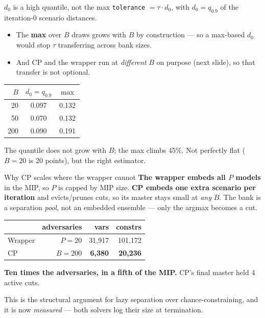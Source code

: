 \documentclass{beamer}
\begin{document}
\begin{frame}{$d_0$ is a high quantile, not the max}
  \small
  \texttt{tolerance} $=\tau\cdot d_0$, with $d_0 = q_{0.9}$ of the iteration-0
  scenario distances.
  \begin{itemize}
    \item The \textbf{max} over $B$ draws grows with $B$ by construction --- so a
      max-based $d_0$ would stop $\tau$ transferring across bank sizes.
    \item And CP and the wrapper run at \emph{different} $B$ on purpose (next
      slide), so that transfer is not optional.
  \end{itemize}
  \medskip
  \begin{center}\small
  \begin{tabular}{@{}rcc@{}}
    \toprule
    $B$ & $d_0 = q_{0.9}$ & $\max$ \\
    \midrule
     20 & 0.097 & 0.132 \\
     50 & 0.070 & 0.132 \\
    200 & 0.090 & 0.191 \\
    \bottomrule
  \end{tabular}
  \end{center}
  \medskip
  \footnotesize
  The quantile does not grow with $B$; the max climbs 45\%. Not perfectly flat
  ($B=20$ is 20 points), but the right estimator.
\end{frame}

\begin{frame}{Why CP scales where the wrapper cannot}
  \small
  \textbf{The wrapper embeds all $P$ models} in the MIP, so $P$ is capped by MIP
  size. \textbf{CP embeds one extra scenario per iteration} and evicts/prunes
  cuts, so its master stays small at \emph{any} $B$. The bank is a separation
  \emph{pool}, not an embedded ensemble --- only the argmax becomes a cut.
  \medskip
  \begin{center}\small
  \begin{tabular}{@{}lrrr@{}}
    \toprule
    & adversaries & vars & constrs \\
    \midrule
    Wrapper & $P=20$  & 31{,}917 & 101{,}172 \\
    CP      & $B=200$ & \textbf{6{,}380} & \textbf{20{,}236} \\
    \bottomrule
  \end{tabular}
  \end{center}
  \medskip
  \textbf{Ten times the adversaries, in a fifth of the MIP.} CP's final master
  held 4 active cuts.
  \medskip

  This is the structural argument for lazy separation over chance-constraining,
  and it is now \emph{measured} --- both solvers log their size at termination.
\end{frame}
\end{document}

